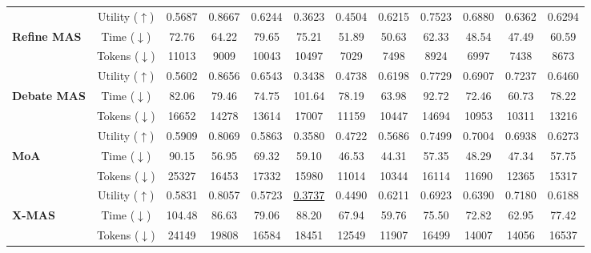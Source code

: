 \documentclass{llmxive}
\begin{document}
{\begin{table}[!t]
{\begin{tabular}{l|c|ccc|ccc|ccc|c}
        \addlinespace[-0.4ex] \midrule \addlinespace[-0.000ex]
        \rowcolor{gray!16}
        \multicolumn{12}{c}{
            \rule{0pt}{1.1em}
            \textbf{\textit{Multi-Agent Setting}}
            \rule[-0.3em]{0pt}{1.1em}
        } \\
        [-0.4ex]\midrule\addlinespace[-0.000ex]

        \cellcolor{yellow!7}
        & Utility ($\uparrow$)   & 0.5687 & 0.8667 & 0.6244 & 0.3623 & 0.4504 & 0.6215 & 0.7523 & 0.6880 & 0.6362 & 0.6294\\
        \cellcolor{yellow!7}\textbf{Refine MAS \citeyearpar{DBLP:conf/nips/MadaanTGHGW0DPY23}}
        & Time ($\downarrow$)  & 72.76 & 64.22 & 79.65 & 75.21 & 51.89 & 50.63 & 62.33 & 48.54 & 47.49 & 60.59\\
        \cellcolor{yellow!7}
        & Tokens ($\downarrow$) & 11013 & 9009 & 10043 & 10497 & 7029 & 7498 & 8924 & 6997 & 7438 & 8673\\
        [-0.4ex]\midrule\addlinespace[-0.000ex]

        \cellcolor{green!7}
        & Utility ($\uparrow$)   & 0.5602 & 0.8656 & 0.6543 & 0.3438 & 0.4738 & 0.6198 & 0.7729 & 0.6907 & 0.7237 & 0.6460\\
        \cellcolor{green!7}\textbf{Debate MAS \citeyearpar{DBLP:conf/icml/Du00TM24}}
        & Time ($\downarrow$)  & 82.06 & 79.46 & 74.75 & 101.64 & 78.19 & 63.98 & 92.72 & 72.46 & 60.73 & 78.22\\
        \cellcolor{green!7}
        & Tokens ($\downarrow$) & 16652 & 14278 & 13614 & 17007 & 11159 & 10447 & 14694 & 10953 & 10311 & 13216\\
        [-0.4ex]\midrule\addlinespace[-0.000ex]

        \cellcolor{teal!7}
        & Utility ($\uparrow$)   & 0.5909 & 0.8069 & 0.5863 & 0.3580 & 0.4722 & 0.5686 & 0.7499 & 0.7004 & 0.6938 & 0.6273\\
        \cellcolor{teal!7}\textbf{MoA \citeyearpar{DBLP:conf/iclr/WangWAZZ25}}
        & Time ($\downarrow$)  & 90.15 & 56.95 & 69.32 & 59.10 & 46.53 & 44.31 & 57.35 & 48.29 & 47.34 & 57.75\\
        \cellcolor{teal!7}
        & Tokens ($\downarrow$) & 25327 & 16453 & 17332 & 15980 & 11014 & 10344 & 16114 & 11690 & 12365 & 15317\\
        [-0.4ex]\midrule\addlinespace[-0.000ex]

        \cellcolor{blue!7}
        & Utility ($\uparrow$)   & 0.5831 & 0.8057 & 0.5723 & \underline{0.3737} & 0.4490 & 0.6211 & 0.6923 & 0.6390 & 0.7180 & 0.6188\\
        \cellcolor{blue!7}\textbf{X-MAS \citeyearpar{DBLP:journals/corr/abs-2505-16997}}
        & Time ($\downarrow$)  & 104.48 & 86.63 & 79.06 & 88.20 & 67.94 & 59.76 & 75.50 & 72.82 & 62.95 & 77.42\\
        \cellcolor{blue!7}
        & Tokens ($\downarrow$) & 24149 & 19808 & 16584 & 18451 & 12549 & 11907 & 16499 & 14007 & 14056 & 16537\\
        [-0.4ex]\bottomrule


\end{tabular}}
\end{table}}
\end{document}
